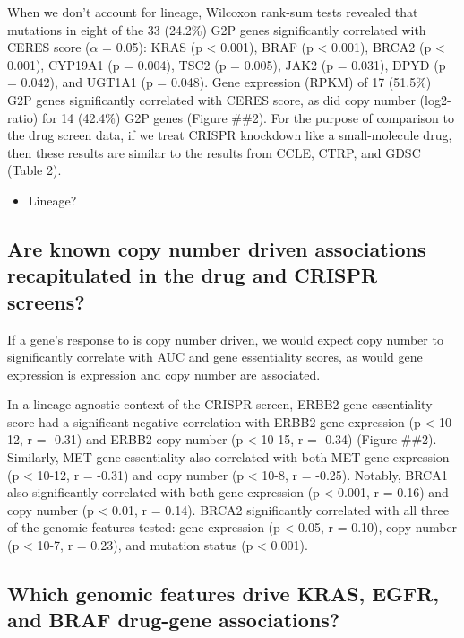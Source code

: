 \documentclass[man]{apa6}
\providecommand{\tightlist}{%
  \setlength{\itemsep}{0pt}\setlength{\parskip}{0pt}}
\begin{document}
When we don't account for lineage, Wilcoxon rank-sum tests revealed that
mutations in eight of the 33 (24.2\%) G2P genes significantly correlated
with CERES score (\(\alpha\) = 0.05): KRAS (p \textless{} 0.001), BRAF
(p \textless{} 0.001), BRCA2 (p \textless{} 0.001), CYP19A1 (p = 0.004),
TSC2 (p = 0.005), JAK2 (p = 0.031), DPYD (p = 0.042), and UGT1A1 (p =
0.048). Gene expression (RPKM) of 17 (51.5\%) G2P genes significantly
correlated with CERES score, as did copy number (log2-ratio) for 14
(42.4\%) G2P genes (Figure \#\#2). For the purpose of comparison to the
drug screen data, if we treat CRISPR knockdown like a small-molecule
drug, then these results are similar to the results from CCLE, CTRP, and
GDSC (Table 2).

\begin{itemize}
\tightlist
\item
  Lineage?
\end{itemize}

\subsection{Are known copy number driven associations recapitulated in
the drug and CRISPR
screens?}\label{are-known-copy-number-driven-associations-recapitulated-in-the-drug-and-crispr-screens}

If a gene's response to is copy number driven, we would expect copy
number to significantly correlate with AUC and gene essentiality scores,
as would gene expression is expression and copy number are associated.

In a lineage-agnostic context of the CRISPR screen, ERBB2 gene
essentiality score had a significant negative correlation with ERBB2
gene expression (p \textless{} 10-12, r = -0.31) and ERBB2 copy number
(p \textless{} 10-15, r = -0.34) (Figure \#\#2). Similarly, MET gene
essentiality also correlated with both MET gene expression (p
\textless{} 10-12, r = -0.31) and copy number (p \textless{} 10-8, r =
-0.25). Notably, BRCA1 also significantly correlated with both gene
expression (p \textless{} 0.001, r = 0.16) and copy number (p
\textless{} 0.01, r = 0.14). BRCA2 significantly correlated with all
three of the genomic features tested: gene expression (p \textless{}
0.05, r = 0.10), copy number (p \textless{} 10-7, r = 0.23), and
mutation status (p \textless{} 0.001).

\subsection{Which genomic features drive KRAS, EGFR, and BRAF drug-gene
associations?}\label{which-genomic-features-drive-kras-egfr-and-braf-drug-gene-associations}
\end{document}
